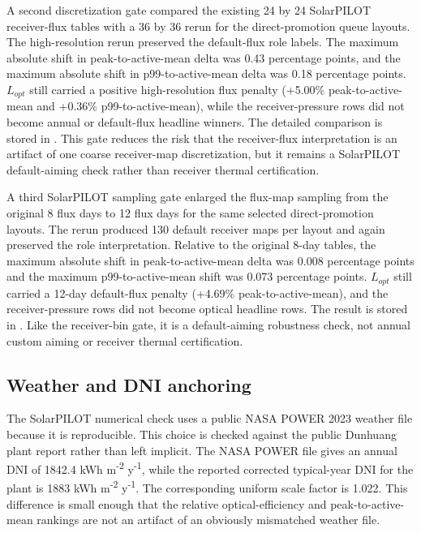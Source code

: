\documentclass[final,3p,times]{elsarticle}
\begin{document}
A second discretization gate compared the existing 24 by 24 SolarPILOT receiver-flux tables with a 36 by 36 rerun for the direct-promotion queue layouts. The high-resolution rerun preserved the default-flux role labels. The maximum absolute shift in peak-to-active-mean delta was 0.43 percentage points, and the maximum absolute shift in p99-to-active-mean delta was 0.18 percentage points. $L_{opt}$ still carried a positive high-resolution flux penalty (+5.00\% peak-to-active-mean and +0.36\% p99-to-active-mean), while the receiver-pressure rows did not become annual or default-flux headline winners. The detailed comparison is stored in . This gate reduces the risk that the receiver-flux interpretation is an artifact of one coarse receiver-map discretization, but it remains a SolarPILOT default-aiming check rather than receiver thermal certification.

A third SolarPILOT sampling gate enlarged the flux-map sampling from the original 8 flux days to 12 flux days for the same selected direct-promotion layouts. The rerun produced 130 default receiver maps per layout and again preserved the role interpretation. Relative to the original 8-day tables, the maximum absolute shift in peak-to-active-mean delta was 0.008 percentage points and the maximum p99-to-active-mean shift was 0.073 percentage points. $L_{opt}$ still carried a 12-day default-flux penalty (+4.69\% peak-to-active-mean), and the receiver-pressure rows did not become optical headline rows. The result is stored in . Like the receiver-bin gate, it is a default-aiming robustness check, not annual custom aiming or receiver thermal certification.

\subsection{Weather and DNI anchoring}
The SolarPILOT numerical check uses a public NASA POWER 2023 weather file because it is reproducible. This choice is checked against the public Dunhuang plant report rather than left implicit. The NASA POWER file gives an annual DNI of 1842.4 kWh m\textsuperscript{-2} y\textsuperscript{-1}, while the reported corrected typical-year DNI for the plant is 1883 kWh m\textsuperscript{-2} y\textsuperscript{-1}. The corresponding uniform scale factor is 1.022. This difference is small enough that the relative optical-efficiency and peak-to-active-mean rankings are not an artifact of an obviously mismatched weather file.
\end{document}
